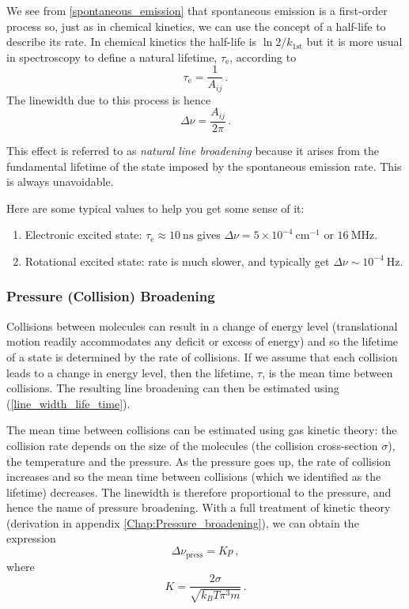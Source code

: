 \documentclass{article}
\theoremstyle{plain}\theoremheaderfont{\normalfont\itshape}\theorembodyfont{\rmfamily}\theoremseparator{.}\newtheorem*{rem}{Remark}\newtheorem*{ex}{Example}\newtheorem*{proof}{Proof}\newtheorem*{altp}{Alternative proof}
\theoremstyle{plain}\theoremheaderfont{\normalfont\bfseries}\theorembodyfont{\rmfamily}\theoremseparator{.}\newtheorem{thm}{Theorem}[section]\newtheorem{lem}[thm]{Lemma}\newtheorem{prop}[thm]{Proposition}\newtheorem*{cor}{Corollary}\newtheorem{defn}[thm]{Definition}\newtheorem{clm}[thm]{Claim}\newtheorem{clminproof}{Claim}\newtheorem{pos}{Postulate}[section]
\theoremstyle{break}\theoremheaderfont{\normalfont\itshape}\theorembodyfont{\rmfamily}\theoremseparator{.\medskip}\newtheorem*{proofskip}{Proof}\newtheorem*{exs}{Examples}\newtheorem*{rems}{Remarks}
\theoremstyle{break}\theoremheaderfont{\normalfont\bfseries}\theorembodyfont{\rmfamily}\theoremseparator{.\medskip}\newtheorem{lemskip}[thm]{Lemma}\newtheorem{defnskip}[thm]{Definition}\newtheorem{propskip}[thm]{Proposition}\newtheorem{thmskip}[thm]{Theorem}
\numberwithin{equation}{section}
\newcommand{\unit}[1]{\ \mathrm{#1}}
\begin{document}
    We see from \cref{spontaneous_emission} that spontaneous emission is a first-order process so, just as in chemical kinetics, we can use the concept of a half-life to describe its rate. In chemical kinetics the half-life is \(\ln 2/k_{1\text{st}}\) but it is more usual in spectroscopy to define a natural lifetime, \(\tau_{\text{e}}\), according to
    \begin{equation}
        \tau_{\text{e}}=\frac{1}{A_{ij}}\,.
    \end{equation}
    The linewidth due to this process is hence
    \begin{equation}
        \Delta\nu=\frac{A_{ij}}{2\pi}\,.
    \end{equation}

    This effect is referred to as \textit{natural line broadening} because it arises from the fundamental lifetime of the state imposed by the spontaneous emission rate. This is always unavoidable.

    Here are some typical values to help you get some sense of it:
    \begin{enumerate}[topsep=0pt,label=(\roman*)]
        \item Electronic excited state: \(\tau_{\text{e}}\approx 10\unit{ns}\) gives \(\Delta\nu=5\times 10^{-4}\unit{cm}^{-1}\) or \(16\unit{MHz}\).
        \item Rotational excited state: rate is much slower, and typically get \(\Delta\nu\sim 10^{-4}\unit{Hz}\).
    \end{enumerate}
    \subsubsection{Pressure (Collision) Broadening}
    Collisions between molecules can result in a change of energy level (translational motion readily accommodates any deficit or excess of energy) and so the lifetime of a state is determined by the rate of collisions. If we assume that each collision leads to a change in energy level, then the lifetime, \(\tau\), is the mean time between collisions. The resulting line broadening can then be estimated using (\ref{line_width_life_time}).

    The mean time between collisions can be estimated using gas kinetic theory: the collision rate depends on the size of the molecules (the collision cross-section \(\sigma\)), the temperature and the pressure. As the pressure goes up, the rate of collision increases and so the mean time between collisions (which we identified as the lifetime) decreases. The linewidth is therefore proportional to the pressure, and hence the name of pressure broadening. With a full treatment of kinetic theory (derivation in appendix \cref{Chap:Pressure_broadening}), we can obtain the expression
    \begin{equation}
        \Delta\nu_{\text{press}}=Kp\,,
    \end{equation}
    where
    \begin{equation}
        K=\frac{2\sigma}{\sqrt{k_BT\pi^3 m}}\,.
    \end{equation}
\end{document}
